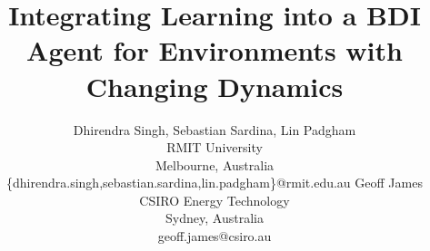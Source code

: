\documentclass{article}
\title{Integrating Learning into a BDI Agent for Environments with Changing Dynamics}
\author{
Dhirendra Singh, Sebastian Sardina, Lin Padgham\\
RMIT University\\
Melbourne, Australia\\
{\normalsize\{dhirendra.singh,sebastian.sardina,lin.padgham\}@rmit.edu.au}
\And
Geoff James\\
CSIRO Energy Technology\\
Sydney, Australia\\
{\normalsize geoff.james@csiro.au}
}
\begin{document}
\maketitle

\begin{abstract}

\end{abstract}









\small


\end{document}
